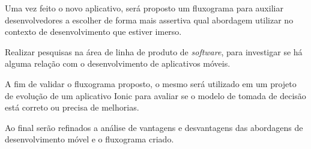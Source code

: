 Uma vez feito o novo aplicativo, será proposto um fluxograma para auxiliar desenvolvedores a escolher de forma mais assertiva qual abordagem utilizar no contexto de desenvolvimento que estiver imerso.

Realizar pesquisas na área de linha de produto de \textit{software}, para investigar se há alguma relação com o desenvolvimento de aplicativos móveis.

A fim de validar o fluxograma proposto, o mesmo será utilizado em um projeto de evolução de um aplicativo Ionic para avaliar se o modelo de tomada de decisão está correto ou precisa de melhorias.

Ao final serão refinados a análise de vantagens e desvantagens das abordagens de desenvolvimento móvel e o fluxograma criado.